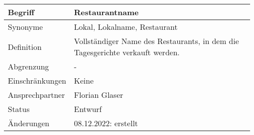 \begin{table}[H]
    \centering
    \label{gls:restaurantname}
    \begin{tabularx}{\textwidth}{| l | X |}
        \hline
        Begriff         & Restaurantname                                                                \\
        \hline
        Synonyme        & Lokal, Lokalname, Restaurant                                                  \\
        \hline
        Definition      & Vollständiger Name des Restaurants, in dem die Tagesgerichte verkauft werden. \\
        \hline
        Abgrenzung      & -                                                                             \\
        \hline
        Einschränkungen & Keine                                                                         \\
        \hline
        Ansprechpartner & Florian Glaser                                                                \\
        \hline
        Status          & Entwurf                                                                       \\
        \hline
        Änderungen      & 08.12.2022: erstellt                                                          \\
        \hline
    \end{tabularx}
\end{table}

